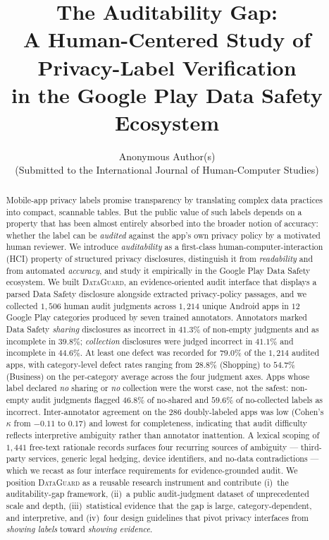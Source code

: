 \documentclass[11pt,a4paper]{article}
\title{\bfseries The Auditability Gap: \\
A Human-Centered Study of Privacy-Label Verification \\
in the Google Play Data Safety Ecosystem}
\author{Anonymous Author(s)\\\small (Submitted to the International Journal of
Human-Computer Studies)}
\date{}
\newcommand{\dataguard}{\textsc{DataGuard}}
\begin{document}
\maketitle

\begin{abstract}
\noindent
Mobile-app privacy labels promise transparency by translating complex data
practices into compact, scannable tables. But the public value of such labels
depends on a property that has been almost entirely absorbed into the broader
notion of accuracy: whether the label can be \emph{audited} against the app's
own privacy policy by a motivated human reviewer. We introduce
\emph{auditability} as a first-class human-computer-interaction (HCI) property
of structured privacy disclosures, distinguish it from \emph{readability} and
from automated \emph{accuracy}, and study it empirically in the Google Play
Data Safety ecosystem. We built \dataguard, an evidence-oriented audit
interface that displays a parsed Data Safety disclosure alongside extracted
privacy-policy passages, and we collected $1{,}506$ human audit judgments
across $1{,}214$ unique Android apps in $12$ Google Play categories produced by
seven trained annotators. Annotators marked Data Safety \emph{sharing}
disclosures as incorrect in $41.3\%$ of non-empty judgments and as incomplete
in $39.8\%$; \emph{collection} disclosures were judged incorrect in $41.1\%$
and incomplete in $44.6\%$. At least one defect was recorded for $79.0\%$ of
the $1{,}214$ audited apps, with category-level defect rates ranging from
$28.8\%$ (Shopping) to $54.7\%$ (Business) on the per-category
average across the four judgment axes. Apps whose label declared
\emph{no} sharing or \emph{no} collection were the worst case, not the safest:
non-empty audit judgments flagged $46.8\%$ of no-shared and $59.6\%$ of
no-collected labels as incorrect. Inter-annotator agreement on the $286$
doubly-labeled apps was low (Cohen's $\kappa$ from $-0.11$ to $0.17$) and
lowest for completeness, indicating that audit difficulty reflects interpretive
ambiguity rather than annotator inattention. A lexical scoping of $1{,}441$
free-text rationale records surfaces four recurring sources of ambiguity ---
third-party services, generic legal hedging, device identifiers, and no-data
contradictions --- which we recast as four interface requirements for
evidence-grounded audit. We position \dataguard{} as a reusable research
instrument and contribute (i)~the auditability-gap framework, (ii)~a public
audit-judgment dataset of unprecedented scale and depth, (iii)~statistical
evidence that the gap is large, category-dependent, and interpretive, and
(iv)~four design guidelines that pivot privacy interfaces from
\emph{showing labels} toward \emph{showing evidence}.
\end{abstract}
\end{document}
